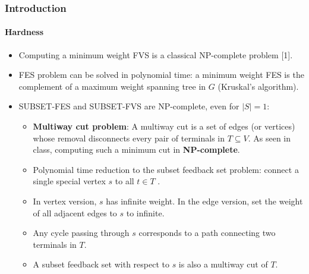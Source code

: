 \documentclass[10pt]{beamer}
\begin{document}
\begin{frame}
\frametitle{Introduction}
\framesubtitle{Hardness}
\begin{itemize}
    \item Computing a minimum weight FVS is a classical NP-complete problem [1].
    \item FES problem can be solved in polynomial time: a minimum weight FES is the complement of a maximum weight
    spanning tree in \(G\) (Kruskal's algorithm).
    \item SUBSET-FES and SUBSET-FVS are NP-complete, even for \(|S| = 1\):
        \begin{itemize}
            \item \textbf{Multiway cut problem}: A multiway cut is a set of edges (or vertices) whose removal disconnects every pair of terminals in \(T \subseteq V\). As seen in class, computing such a minimum cut in \textbf{NP-complete}.
            \item Polynomial time reduction to the subset feedback set problem: connect a single special vertex \(s\) to all \(t \in T\) .
            \item In vertex version, \(s\) has infinite weight. In the edge version, set the weight of all adjacent edges to \(s\) to infinite.
            \item Any cycle passing through \(s\) corresponds to a path connecting two terminals in \(T\).
            \item A subset feedback set with respect to \(s\) is also a multiway cut of \(T\).
        \end{itemize}
\end{itemize}
\end{frame}
\end{document}
